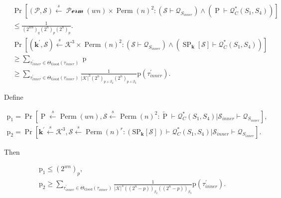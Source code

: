 $$
\begin{aligned}
&\operatorname{Pr}\left[(\mathcal{P}, \mathcal{S}) \stackrel{s}{\leftarrow} \mathcal{\operatorname{Perm}}(w n) \times \operatorname{Perm}(n)^{2}:\left(\mathcal{S} \vdash \mathcal{Q}_{S_{inner}}\right) \wedge\left(\operatorname{P} \vdash \mathcal{Q}_{C}^{*}\left(S_{1},S_{4}\right)\right)\right] \\
&\leq  \frac{1}{\left(2^{w n}\right)_{q}\left(2^{n}\right)_{p}\left(2^{n}\right)_{p}}. \\
&\operatorname{Pr}\left[(\mathbf{k}^{\prime}, \mathcal{S}) \stackrel{s}{\leftarrow} \mathcal{K}^{3} \times \operatorname{Perm}(n)^{2}:\left(\mathcal{S} \vdash \mathcal{Q}_{S_{inner}}\right) \wedge\left(\operatorname{SP}_{\mathbf{k}}[\mathcal{S}] \vdash \mathcal{Q}_{C}^{*}\left(S_{1},S_{4}\right)\right)\right] \\
& \geq \sum_{\tau_{inner}^{\prime} \in \Theta_{\mathrm{Good}}(\tau_{inner})} \operatorname{p}\\
&\geq \sum_{\tau_{inner}^{\prime} \in \Theta_{\mathrm{Good}}(\tau_{inner})} \frac{1}{|\mathcal{K}|^{3}\left(2^{n}\right)_{p+\beta_{2}}\left(2^{n}\right)_{p+\beta_{3}}} \mathrm{p}\left(\tau_{inner}^{\prime}\right).
\end{aligned}
$$

Define

$$
\begin{aligned}
\mathrm{p}_{1}=\operatorname{Pr}\left[\operatorname{P} \stackrel{s}{\leftarrow} \operatorname{Perm}(w n), \mathcal{S} \stackrel{s}{\leftarrow} \operatorname{Perm}(n)^{2}: \widetilde{\operatorname{P}} \vdash \mathcal{Q}_{C}^{*}\left(S_{1},S_{4}\right) | \mathcal{S}_{inner} \vdash \mathcal{Q}_{S_{inner}}\right],\\
\mathrm{p}_{2}=\operatorname{Pr}\left[\mathbf{k}^{\prime} \stackrel{s}{\leftarrow} \mathcal{K}^{3}, \mathcal{S} \stackrel{s}{\leftarrow} \operatorname{Perm}(n)^{r}:\left(\mathrm{SP}_{\mathbf{k}}[\mathcal{S}]\right) \vdash \mathcal{Q}_{C}^{*}\left(S_{1},S_{4}\right) | \mathcal{S}_{inner} \vdash \mathcal{Q}_{S_{inner}}\right].
\end{aligned}
$$

Then

$$
\begin{aligned}
&\mathrm{p}_{1} \leq \left(2^{w n}\right)_{p},\\
&\mathrm{p}_{2} \geq  \sum_{\tau_{inner}^{\prime} \in \Theta_{\mathrm{Good}}(\tau_{inner})} \frac{1}{|\mathcal{K}|^{3}\left((2^{n}-p)\right)_{\beta_{2}}\left((2^{n}-p)\right)_{\beta_{3}}} \mathrm{p}\left(\tau_{inner}^{\prime}\right).
\end{aligned}
$$

